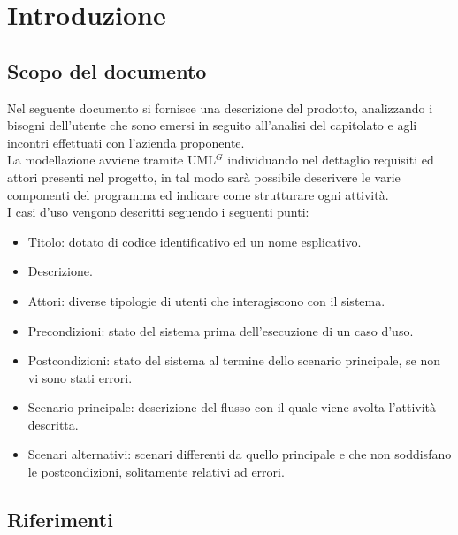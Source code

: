 \section{Introduzione}

\subsection{Scopo del documento}
Nel seguente documento si fornisce una descrizione del prodotto, analizzando i bisogni dell'utente che sono emersi in seguito all'analisi del capitolato e agli incontri effettuati con l'azienda proponente. \\
La modellazione avviene tramite UML$^G$ individuando nel dettaglio requisiti ed attori presenti nel progetto, in tal modo sarà possibile descrivere le varie componenti del programma ed indicare come strutturare ogni attività. \\ 

\noindent
I casi d'uso vengono descritti seguendo i seguenti punti:
\begin{itemize}
    \item Titolo: dotato di codice identificativo ed un nome esplicativo.
    \item Descrizione.
    \item Attori: diverse tipologie di utenti che interagiscono con il sistema.
    \item Precondizioni: stato del sistema prima dell'esecuzione di un caso d'uso.
    \item Postcondizioni: stato del sistema al termine dello scenario principale, se non vi sono stati errori.
    \item Scenario principale: descrizione del flusso con il quale viene svolta l'attività descritta.
    \item Scenari alternativi: scenari differenti da quello principale e che non soddisfano le postcondizioni, solitamente relativi ad errori.
\end{itemize}

\subsection{Riferimenti}
